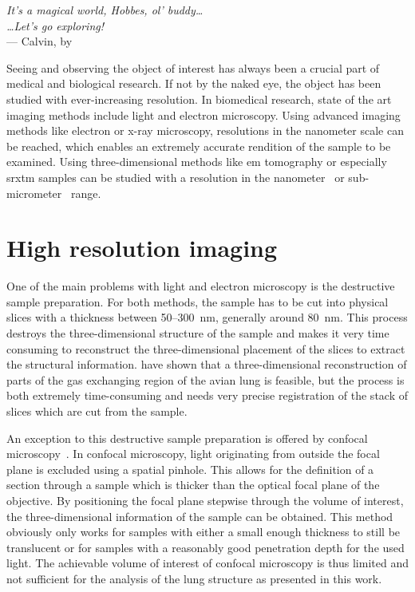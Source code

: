 \acresetall
{}\label{ch:introduction}
\begin{flushright}{\slshape
		It's a magical world, Hobbes, ol' buddy\ldots\\
		\ldots Let's go exploring!}\\ \medskip
		--- Calvin, by \citep{Watterson1996}
\end{flushright}
\vspace{74mm}

Seeing and observing the object of interest has always been a crucial part of medical and biological research. If not by the naked eye, the object has been studied with ever-increasing resolution. In biomedical research, state of the art imaging methods include light and electron microscopy. Using advanced imaging methods like electron or x-ray microscopy, resolutions in the nanometer scale can be reached, which enables an extremely accurate rendition of the sample to be examined. Using three-dimensional methods like \ac{em} tomography or especially \ac{srxtm} samples can be studied with a resolution in the nanometer~\cite{Downing2007} or sub-micrometer~\cite{Stampanoni2010} range.

\section{High resolution imaging}
One of the main problems with light and electron microscopy is the destructive sample preparation. For both methods, the sample has to be cut into physical slices with a thickness between 50--\SI{300}{\nano\meter}, generally around \SI{80}{\nano\meter}. This process destroys the three-dimensional structure of the sample and makes it very time consuming to reconstruct the three-dimensional placement of the slices to extract the structural information. \citet{Woodward2005} have shown that a three-dimensional reconstruction of parts of the gas exchanging region of the avian lung is feasible, but the process is both extremely time-consuming and needs very precise registration of the stack of slices which are cut from the sample.

An exception to this destructive sample preparation is offered by confocal microscopy~\cite{Minsky1961}. In confocal microscopy, light originating from outside the focal plane is excluded using a spatial pinhole. This allows for the definition of a section through a sample which is thicker than the optical focal plane of the objective. By positioning the focal plane stepwise through the volume of interest, the three-dimensional information of the sample can be obtained. This method obviously only works for samples with either a small enough thickness to still be translucent or for samples with a reasonably good penetration depth for the used light. The achievable volume of interest of confocal microscopy is thus limited and not sufficient for the analysis of the lung structure as presented in this work. 

